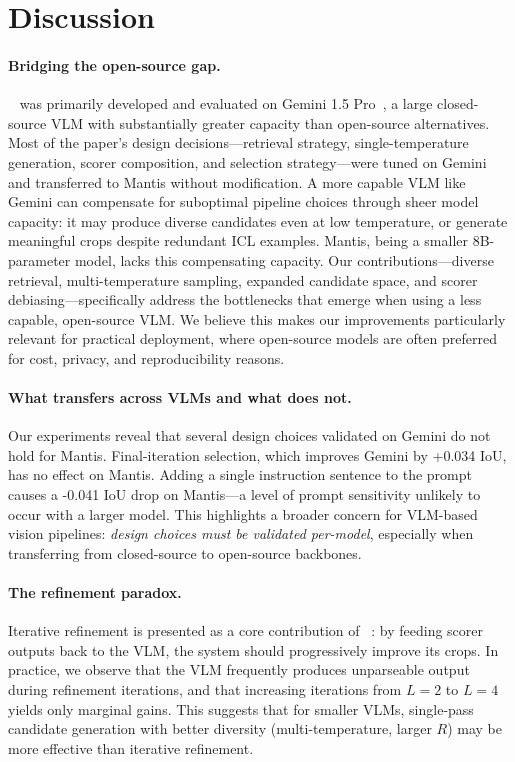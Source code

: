 \section{Discussion}
\label{sec:discussion}

\paragraph{Bridging the open-source gap.}
\baseline~\cite{cropper2025} was primarily developed and evaluated on
Gemini 1.5 Pro~\cite{gemini2024}, a large closed-source VLM with
substantially greater capacity than open-source alternatives.  Most of
the paper's design decisions---retrieval strategy, single-temperature
generation, scorer composition, and selection strategy---were tuned on
Gemini and transferred to Mantis without modification.  A more capable
VLM like Gemini can compensate for suboptimal pipeline choices through
sheer model capacity: it may produce diverse candidates even at low
temperature, or generate meaningful crops despite redundant ICL
examples.  Mantis, being a smaller 8B-parameter model, lacks this
compensating capacity.  Our contributions---diverse retrieval,
multi-temperature sampling, expanded candidate space, and scorer
debiasing---specifically address the bottlenecks that emerge when using
a less capable, open-source VLM.  We believe this makes our
improvements particularly relevant for practical deployment, where
open-source models are often preferred for cost, privacy, and
reproducibility reasons.

\paragraph{What transfers across VLMs and what does not.}
Our experiments reveal that several design choices validated on Gemini
do not hold for Mantis.  Final-iteration selection, which improves
Gemini by +0.034 IoU, has no effect on Mantis.  Adding a single
instruction sentence to the prompt causes a -0.041 IoU drop on
Mantis---a level of prompt sensitivity unlikely to occur with a larger
model.  This highlights a broader concern for VLM-based vision
pipelines: \emph{design choices must be validated per-model}, especially
when transferring from closed-source to open-source backbones.

\paragraph{The refinement paradox.}
Iterative refinement is presented as a core contribution of
\baseline~\cite{cropper2025}: by feeding scorer outputs back to the
VLM, the system should progressively improve its crops.  In practice,
we observe that the VLM frequently produces unparseable output during
refinement iterations, and that increasing iterations from $L{=}2$ to
$L{=}4$ yields only marginal gains.  This suggests that for smaller
VLMs, single-pass candidate generation with better diversity
(multi-temperature, larger $R$) may be more effective than iterative
refinement.

